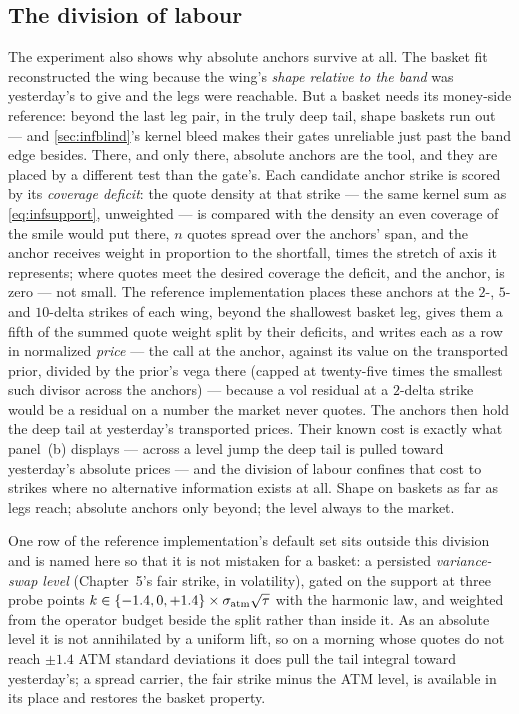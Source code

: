 \subsection{The division of labour}

The experiment also shows why absolute anchors survive at all.  The
basket fit reconstructed the wing because the wing's \emph{shape
relative to the band} was yesterday's to give and the legs were
reachable.  But a basket needs its money-side reference: beyond the
last leg pair, in the truly deep tail, shape baskets run out --- and
\cref{sec:infblind}'s kernel bleed makes their gates unreliable
just past the band edge besides.  There, and only there, absolute
anchors are the tool, and they are placed by a different test than
the gate's.  Each candidate anchor strike is scored by its
\emph{coverage deficit}: the quote density at that strike --- the
same kernel sum as \cref{eq:infsupport}, unweighted --- is compared
with the density an even coverage of the smile would put there,
$n$ quotes spread over the anchors' span, and the anchor receives
weight in proportion to the shortfall, times the stretch of axis it
represents; where quotes meet the desired coverage the deficit, and
the anchor, is zero --- not small.  The reference implementation
places these anchors at the $2$-, $5$- and $10$-delta strikes of
each wing, beyond the shallowest basket leg, gives them a fifth of
the summed quote weight split by their deficits, and writes each as
a row in normalized \emph{price} --- the call at the anchor, against
its value on the transported prior, divided by the prior's vega
there (capped at twenty-five times the smallest such divisor across
the anchors) --- because a vol residual at a $2$-delta strike would
be a residual on a number the market never quotes.  The anchors then
hold the deep tail at yesterday's transported prices.  Their known
cost is exactly what panel~(b) displays --- across a level jump the
deep tail is pulled toward yesterday's absolute prices --- and the
division of labour confines that cost to strikes where no
alternative information exists at all.  Shape on baskets as far as
legs reach; absolute anchors only beyond; the level always to the
market.

One row of the reference implementation's default set sits outside
this division and is named here so that it is not mistaken for a
basket: a persisted \emph{variance-swap level} (Chapter~5's fair
strike, in volatility), gated on the support at three probe points
$k\in\{-1.4,0,+1.4\}\times\sigma_{\rm atm}\sqrt\tau$ with the
harmonic law, and weighted from the operator budget beside the split
rather than inside it.  As an absolute level it is not annihilated
by a uniform lift, so on a morning whose quotes do not reach $\pm1.4$
ATM standard deviations it does pull the tail integral toward
yesterday's; a spread carrier, the fair strike minus the ATM level,
is available in its place and restores the basket property.

